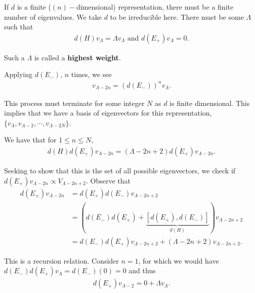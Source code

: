 
If $d$ is a finite ($\left( n \right)-$dimensional) representation, there must be a finite number of eigenvalues. We take $d$ to be irreducible here. There must be some $\Lambda$ such that
\begin{align}
    d \left( H \right) v_{\Lambda} = \Lambda v_{\Lambda} \text{~and~} d \left( E_+ \right)  v_{\Lambda} = 0
.\end{align}

Such a $\Lambda$ is called a \textbf{highest weight}.

Applying $d \left( E_- \right) $, $n$ times, we see
\begin{align}
    v_{\Lambda - 2n} = \left( d \left( E_- \right)  \right)^{n} v_{\Lambda}
.\end{align}

This process must terminate for some integer $N$ as $d$ is finite dimensional. This implies that we have a basis of eigenvectors for this representation, $\{v_{\Lambda}, v_{\Lambda - 2}, \cdots, v_{\Lambda - 2 N}\} $. 

We have that for $1 \leq n \leq N$,
\begin{align}
    d \left( H \right)  d\left( E_+ \right) v_{\Lambda - 2n} = \left( \Lambda - 2n + 2 \right) d \left( E_+ \right) v_{\Lambda - 2n}
.\end{align}

Seeking to show that this is the set of all possible eigenvectors, we check if $d \left( E_+ \right) v_{\Lambda - 2n} \propto V_{\Lambda-2n+2}$. Observe that
\begin{align}
    d \left( E_+ \right)  v_{\Lambda - 2n} &= d \left( E_{+} \right) d \left( E_- \right) v_{\Lambda - 2n + 2}  \\
    &= \left( d \left( E_- \right) d\left( E_+ \right) + \underbrace{\left[ d \left( E_+ \right) , d\left( E_- \right)  \right]}_{d \left( H \right) } \right)  v_{\Lambda - 2n + 2} \\
    &= d \left( E_- \right) d \left( E_+ \right) v_{\Lambda - 2n + 2} + \left( \Lambda - 2n + 2 \right) v_{\Lambda - 2n + 2} \label{eq:raised_generic_v}
.\end{align}

This is a recursion relation. Consider $n = 1$, for which we would have $ d\left( E_- \right) d \left( E_+ \right) v_{\Lambda} = d \left( E_- \right) \left( 0 \right) = 0$ and thus
\begin{align}
    d \left( E_+ \right) v_{\Lambda - 2} = 0 + \Lambda v_{\Lambda} \label{eq:second_highest_weight}
.\end{align}

